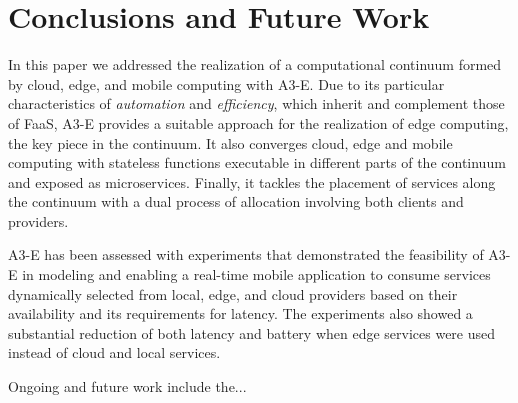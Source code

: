 \section{Conclusions and Future Work}\label{sec:conclusions}

In this paper we addressed the realization of a computational continuum formed by cloud, edge, and mobile computing with A3-E. Due to its particular characteristics of \textit{automation} and \textit{efficiency}, which inherit and complement those of FaaS, A3-E provides a suitable approach for the realization of edge computing, the key piece in the continuum. It also converges cloud, edge and mobile computing with stateless functions executable in different parts of the continuum and exposed as microservices. Finally, it tackles the placement of services along the continuum with a dual process of allocation involving both clients and providers.

A3-E has been assessed with experiments that demonstrated the feasibility of A3-E in modeling and enabling a real-time mobile application to consume services dynamically selected from local, edge, and cloud providers based on their availability and its requirements for latency. The experiments also showed a substantial reduction of both latency and battery when edge services were used instead of cloud and local services. 

Ongoing and future work include the...

 